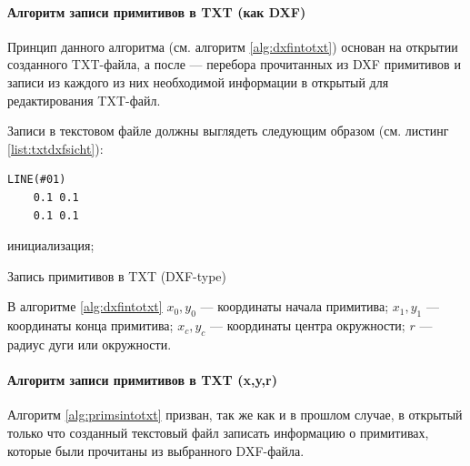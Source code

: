 \paragraph{Алгоритм записи примитивов в TXT (как DXF)} 
\nopagebreak

Принцип данного алгоритма (см. алгоритм \ref{alg:dxfintotxt}) основан на открытии созданного TXT-файла, а после --- перебора прочитанных из DXF примитивов и записи из каждого из них необходимой информации в открытый для редактирования TXT-файл.

Записи в текстовом файле должны выглядеть следующим образом (см. листинг \ref{list:txtdxfsicht}):

\begin{lstlisting}[caption={Пример содержания TXT-файла (как DXF)},label=list:txtdxfsicht]
	LINE(#01)
	0.1 0.1
	0.1 0.1
\end{lstlisting}

\begin{algorithm}[H]
	\SetAlgoLined
	инициализация;
	\caption{Запись примитивов в TXT (DXF-type)}
	\label{alg:dxfintotxt}
\end{algorithm}

\hfill \break

В алгоритме \ref{alg:dxfintotxt} $x_0, y_0$ --- координаты начала примитива; $x_1, y_1$ --- координаты конца примитива; $x_c, y_c$ --- координаты центра окружности; $r$ --- радиус дуги или окружности.

\paragraph{Алгоритм записи примитивов в TXT (x,y,r)} 
\nopagebreak

Алгоритм \ref{alg:primsintotxt} призван, так же как и в прошлом случае, в открытый только что созданный текстовый файл записать информацию о примитивах, которые были прочитаны из выбранного DXF-файла.

